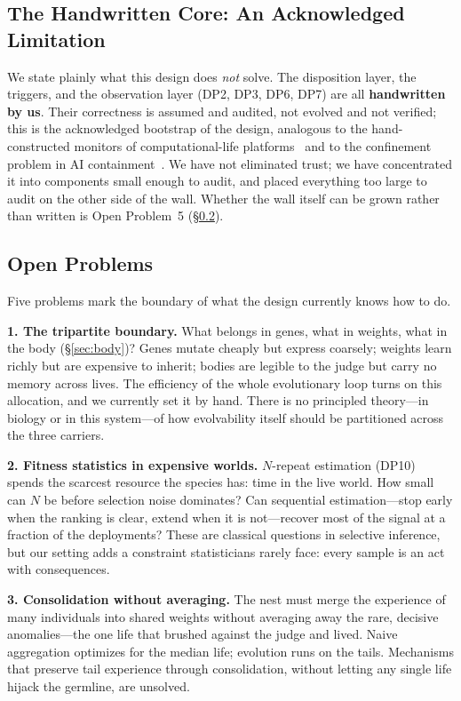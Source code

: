 \documentclass[11pt,a4paper]{article}
\begin{document}
\subsection{The Handwritten Core: An Acknowledged Limitation}
\label{sec:honest}

We state plainly what this design does \emph{not} solve. The disposition layer, the triggers, and the observation layer (DP2, DP3, DP6, DP7) are all \textbf{handwritten by us}. Their correctness is assumed and audited, not evolved and not verified; this is the acknowledged bootstrap of the design, analogous to the hand-constructed monitors of computational-life platforms~\cite{ray1991tierra,ofria2004avida} and to the confinement problem in AI containment~\cite{yampolskiy2012confinement}. We have not eliminated trust; we have concentrated it into components small enough to audit, and placed everything too large to audit on the other side of the wall. Whether the wall itself can be grown rather than written is Open Problem~5 (\S\ref{sec:open}).

\subsection{Open Problems}
\label{sec:open}

Five problems mark the boundary of what the design currently knows how to do.

\textbf{1. The tripartite boundary.} What belongs in genes, what in weights, what in the body (\S\ref{sec:body})? Genes mutate cheaply but express coarsely; weights learn richly but are expensive to inherit; bodies are legible to the judge but carry no memory across lives. The efficiency of the whole evolutionary loop turns on this allocation, and we currently set it by hand. There is no principled theory---in biology or in this system---of how evolvability itself should be partitioned across the three carriers.

\textbf{2. Fitness statistics in expensive worlds.} $N$-repeat estimation (DP10) spends the scarcest resource the species has: time in the live world. How small can $N$ be before selection noise dominates? Can sequential estimation---stop early when the ranking is clear, extend when it is not---recover most of the signal at a fraction of the deployments? These are classical questions in selective inference, but our setting adds a constraint statisticians rarely face: every sample is an act with consequences.

\textbf{3. Consolidation without averaging.} The nest must merge the experience of many individuals into shared weights without averaging away the rare, decisive anomalies---the one life that brushed against the judge and lived. Naive aggregation optimizes for the median life; evolution runs on the tails. Mechanisms that preserve tail experience through consolidation, without letting any single life hijack the germline, are unsolved.
\end{document}
